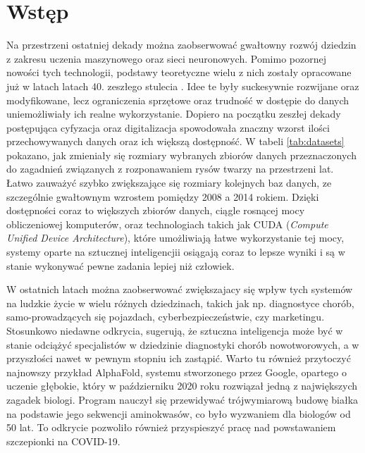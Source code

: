 \documentclass[a4paper,twoside,12pt]{book}
\newcommand{\obcy}[1]{\emph{#1}}
\newcommand{\ang}[1]{{\selectlanguage{british}\obcy{#1}}}
\newcounter{stronyPozaNumeracja}
\begin{document}
\vfill

 

\cleardoublepage


\pagestyle{tylkoNumeryStron}
\tableofcontents

\mainmatter
{}
\setcounter{stronyPozaNumeracja}{\value{page}}
\pagestyle{NumeryStronNazwyRozdzialow}


\chapter{Wstęp}
{Na przestrzeni ostatniej dekady można zaobserwować gwałtowny rozwój dziedzin z zakresu uczenia maszynowego oraz sieci neuronowych. Pomimo pozornej nowości tych technologii, podstawy teoretyczne wielu z nich zostały opracowane już w latach latach 40. zeszłego stulecia \cite{bib:neural1}. Idee te były suckesywnie rozwijane oraz modyfikowane, lecz ograniczenia sprzętowe oraz trudność w dostępie do danych uniemożliwiały ich realne wykorzystanie. Dopiero na początku zeszłej dekady postępująca cyfyzacja oraz digitalizacja spowodowała znaczny wzorst ilości przechowywanych danych oraz ich większą dostępność. W tabeli \ref{tab:datasets} pokazano, jak zmieniały się rozmiary wybranych zbiorów danych przeznaczonych do  zagadnień związanych z rozponawaniem rysów twarzy na przestrzeni lat. Łatwo zauważyć szybko zwiększające się rozmiary kolejnych baz danych, ze szczególnie gwałtownym wzrostem pomiędzy 2008 a 2014 rokiem. Dzięki dostępności coraz to większych zbiorów danych, ciągle rosnącej mocy obliczeniowej komputerów, oraz technologiach takich jak CUDA (\ang {Compute Unified Device Architecture}), które umożliwiają łatwe wykorzystanie tej mocy, systemy oparte na sztucznej inteligencjii osiągają coraz to lepsze wyniki i są w stanie wykonywać pewne zadania lepiej niż człowiek.}

{ W ostatnich latach można zaobserwować zwiększajacy się wpływ tych systemów na ludzkie życie w wielu różnych dziedzinach, takich jak np. diagnostyce chorób, samo-prowadzących się pojazdach, cyberbezpieczeństwie, czy marketingu. Stosunkowo niedawne odkrycia\cite{bib:cancer}, \cite{bib:cancer2} sugerują, że sztuczna inteligencja może być w stanie odciążyć specjalistów w dziedzinie  diagnostyki chorób nowotworowych, a w przyszłości nawet w pewnym stopniu ich zastąpić. Warto tu również przytoczyć najnowszy przykład AlphaFold, systemu stworzonego przez Google, opartego o uczenie głębokie, który w październiku 2020 roku rozwiązał jedną z największych zagadek biologi\cite{service2020game}. Program nauczył się przewidywać trójwymiarową budowę białka na podstawie jego sekwencji aminokwasów, co było wyzwaniem dla biologów od 50 lat. To odkrycie pozwoliło również przyspieszyć pracę nad powstawaniem szczepionki na COVID-19.}
\end{document}
